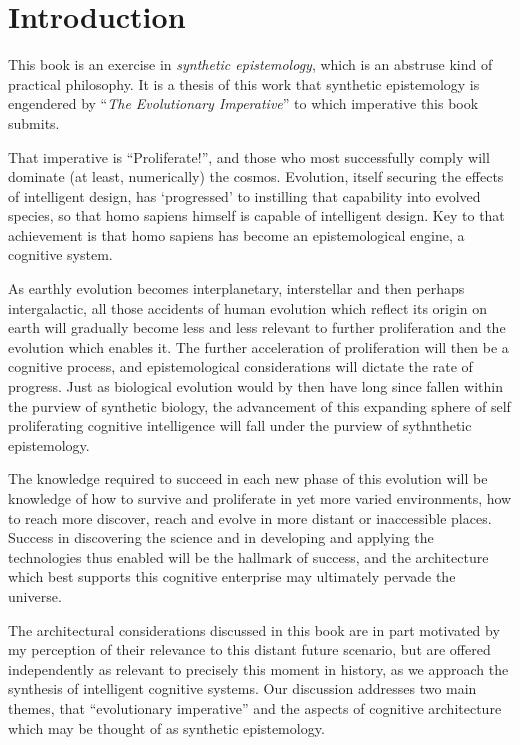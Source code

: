 \mainmatter
\chapter{Introduction}\label{chap:Introduction}

This book is an exercise in \emph{synthetic epistemology}, which is an abstruse kind of practical philosophy.
It is a thesis of this work that synthetic epistemology is engendered by ``\emph{The Evolutionary Imperative}'' to which imperative this book submits.

That imperative is ``Proliferate!'', and those who most successfully comply will dominate (at least, numerically) the cosmos.
Evolution, itself securing the effects of intelligent design, has `progressed' to instilling that capability into evolved species, so that homo sapiens himself is capable of intelligent design.
Key to that achievement is that homo sapiens has become an epistemological engine, a cognitive system.

As earthly evolution becomes interplanetary, interstellar and then perhaps intergalactic, all those accidents of human evolution which reflect its origin on earth will gradually become less and less relevant to further proliferation and the evolution which enables it.
The further acceleration of proliferation will then be a cognitive process, and epistemological considerations will dictate the rate of progress.
Just as biological evolution would by then have long since fallen within the purview of synthetic biology, the advancement of this expanding sphere of self proliferating cognitive intelligence will fall under the purview of sythnthetic epistemology.

The knowledge required to succeed in each new phase of this evolution will be knowledge of how to survive and proliferate in yet more varied environments, how to reach more discover, reach and evolve in more distant or inaccessible places.
Success in discovering the science and in developing and applying the technologies thus enabled will be the hallmark of success, and the architecture which best supports this cognitive enterprise may ultimately pervade the universe.

The architectural considerations discussed in this book are in part motivated by my perception of their relevance to this distant future scenario, but are offered independently as relevant to precisely this moment in history, as we approach the synthesis  of intelligent cognitive systems.
Our discussion addresses two main themes, that ``evolutionary imperative'' and the aspects of cognitive architecture which may be thought of as synthetic epistemology.

